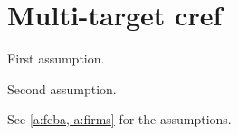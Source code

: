 \section{Multi-target cref}
\label{sec:assumptions}

\begin{assumption}
\label{a:feba}
First assumption.
\end{assumption}

\begin{assumption}
\label{a:firms}
Second assumption.
\end{assumption}

See \cref{a:feba, a:firms} for the assumptions.
